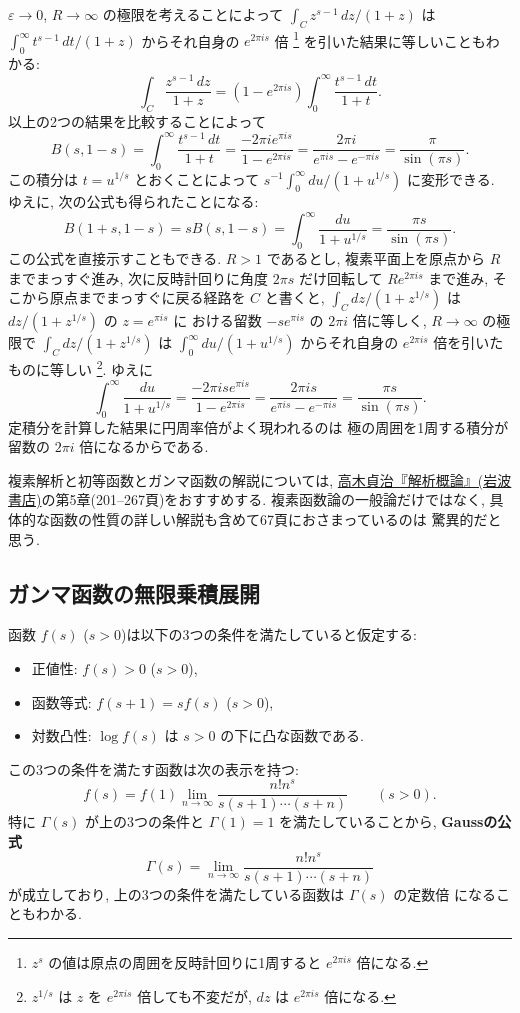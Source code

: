 \documentclass[12pt,twoside]{jarticle}
\newcommand\eps{\varepsilon}
\theoremstyle{jplain}
\theoremstyle{jplain}
\theoremstyle{jplain}
\numberwithin{theorem}{section}
\numberwithin{equation}{section}
\numberwithin{figure}{section}
\numberwithin{table}{section}
\begin{document}
$\eps\to 0$, $R\to\infty$ の極限を考えることによって $\int_C z^{s-1}\,dz/(1+z)$ は
$\int_0^\infty t^{s-1}\,dt/(1+z)$ からそれ自身の $e^{2\pi i s}$ 倍%
\footnote{$z^s$ の値は原点の周囲を反時計回りに1周すると $e^{2\pi i s}$ 倍になる.}
を引いた結果に等しいこともわかる:
\[
\int_C \frac{z^{s-1}\,dz}{1+z} = (1-e^{2\pi i s})\int_0^\infty\frac{t^{s-1}\,dt}{1+t}.
\]
以上の2つの結果を比較することによって
\[
B(s,1-s)
=\int_0^\infty \frac{t^{s-1}\,dt}{1+t}
=\frac{-2\pi i e^{\pi i s}}{1-e^{2\pi i s}}
=\frac{2\pi i}{e^{\pi i s}-e^{-\pi i s}}
=\frac{\pi}{\sin(\pi s)}.
\]
この積分は $t=u^{1/s}$ とおくことによって
$s^{-1}\int_0^\infty du/(1+u^{1/s})$ に変形できる.
ゆえに, 次の公式も得られたことになる:
\[
B(1+s,1-s)=sB(s,1-s)
=\int_0^\infty \frac{du}{1+u^{1/s}} = \frac{\pi s}{\sin(\pi s)}.
\]
この公式を直接示すこともできる.
$R>1$ であるとし,
複素平面上を原点から $R$ までまっすぐ進み,
次に反時計回りに角度 $2\pi s$ だけ回転して $Re^{2\pi is}$ まで進み,
そこから原点までまっすぐに戻る経路を $C$ と書くと,
$\int_C dz/(1+z^{1/s})$ は $dz/(1+z^{1/s})$ の $z=e^{\pi is}$ に
おける留数 $-s e^{\pi is}$ の $2\pi i$ 倍に等しく,
$R\to\infty$ の極限で $\int_C dz/(1+z^{1/s})$
は $\int_0^\infty du/(1+u^{1/s})$ からそれ自身の $e^{2\pi is}$ 倍を引いた
ものに等しい%
\footnote{$z^{1/s}$ は $z$ を $e^{2\pi is}$ 倍しても不変だが,
$dz$ は $e^{2\pi is}$ 倍になる.}. ゆえに
\[
\int_0^\infty \frac{du}{1+u^{1/s}}
=\frac{-2\pi is e^{\pi is}}{1-e^{2\pi is}}
=\frac{2\pi is}{e^{\pi is}-e^{-\pi is}}
=\frac{\pi s}{\sin(\pi s)}.
\]
定積分を計算した結果に円周率倍がよく現われるのは
極の周囲を1周する積分が留数の $2\pi i$ 倍になるからである.

複素解析と初等函数とガンマ函数の解説については,
\href{http://www.amazon.co.jp/dp/4000051717}
{高木貞治『解析概論』(岩波書店)}の第5章(201--267頁)をおすすめする.
複素函数論の一般論だけではなく,
具体的な函数の性質の詳しい解説も含めて67頁におさまっているのは
驚異的だと思う.


\subsection{ガンマ函数の無限乗積展開}
\label{sec:Gamma-prod}

函数 $f(s)$ ($s>0$)は以下の3つの条件を満たしていると仮定する:
\begin{itemize}
\item 正値性: $f(s)>0$ ($s>0$),
\item 函数等式: $f(s+1)=sf(s)$ ($s>0$),
\item 対数凸性: $\log f(s)$ は $s>0$ の下に凸な函数である.
\end{itemize}
この3つの条件を満たす函数は次の表示を持つ:
\[
f(s) = f(1)\lim_{n\to\infty}\frac{n!n^s}{s(s+1)\cdots(s+n)}
\qquad (s>0).
\tag{$*$}
\]
特に $\Gamma(s)$ が上の3つの条件と $\Gamma(1)=1$ を満たしていることから,
{\bfseries Gaussの公式}
\[
\Gamma(s)=\lim_{n\to\infty}\frac{n!n^s}{s(s+1)\cdots(s+n)}
\]
が成立しており, 上の3つの条件を満たしている函数は $\Gamma(s)$ の定数倍
になることもわかる.
\end{document}
